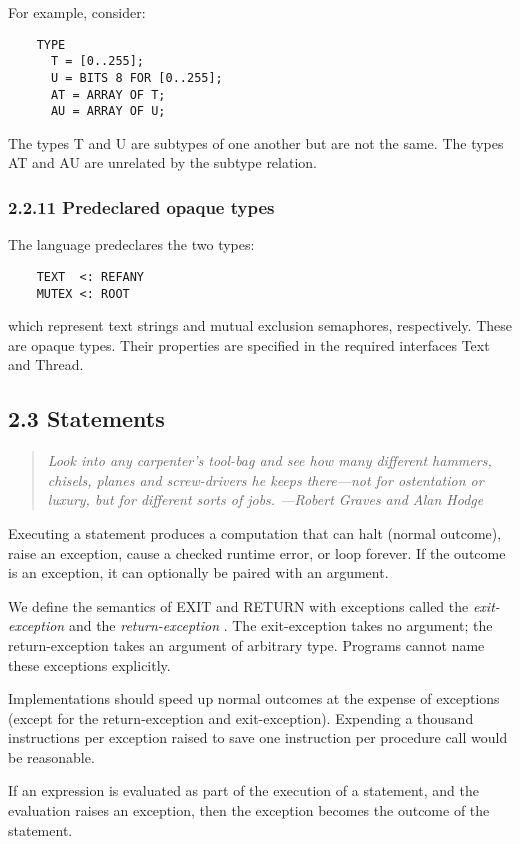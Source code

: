 \documentclass[10pt]{article}
\begin{document}
For example, consider:
\begin{verbatim}
    TYPE
      T = [0..255];
      U = BITS 8 FOR [0..255];
      AT = ARRAY OF T;
      AU = ARRAY OF U;
\end{verbatim}
The types T and U are subtypes of one another but are not the same. The types
AT and AU are unrelated by the subtype relation.

\subsubsection*{2.2.11 Predeclared opaque types}

The language predeclares the two types:
\begin{verbatim}
    TEXT  <: REFANY
    MUTEX <: ROOT
\end{verbatim}
which represent text strings and mutual exclusion semaphores,
respectively. These are opaque types. Their properties are specified in the
required interfaces Text and Thread.

\subsection*{2.3 Statements}

\begin{quote}
  \emph{ Look into any carpenter's tool-bag and see how many different hammers, chisels, planes and screw-drivers he keeps there---not for ostentation or luxury, but for different sorts of jobs. ---Robert Graves and Alan Hodge }
\end{quote}

Executing a statement produces a computation that can halt (normal outcome),
raise an exception, cause a checked runtime error, or loop forever. If the
outcome is an exception, it can optionally be paired with an argument.

We define the semantics of EXIT and RETURN with exceptions called the
\emph{exit-exception} and the \emph{return-exception} . The exit-exception
takes no argument; the return-exception takes an argument of arbitrary
type. Programs cannot name these exceptions explicitly.

Implementations should speed up normal outcomes at the expense of exceptions
(except for the return-exception and exit-exception). Expending a thousand
instructions per exception raised to save one instruction per procedure call
would be reasonable.

If an expression is evaluated as part of the execution of a statement, and the
evaluation raises an exception, then the exception becomes the outcome of the
statement.
\end{document}
